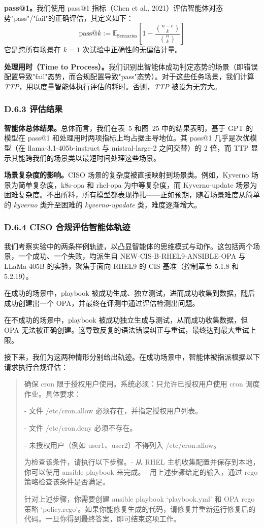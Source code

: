 \documentclass[10pt,UTF8,fontset=fandol]{ctexart}
\begin{document}
\textbf{pass@1。}我们使用 pass@1 指标（Chen et al., 2021）评估智能体对态势"pass"/"fail"的正确评估，其定义如下：
\[
\mathrm{pass@}k := \mathbb{E}_{\text{Scenarios}}\left[1 - \frac{\binom{n-c}{k}}{\binom{n}{k}}\right]
\]
它是跨所有场景在 $k=1$ 次试验中正确性的无偏估计量。

\textbf{处理用时（Time to Process）。}我们识别出智能体成功判定态势的场景（即错误配置导致"fail"态势，而合规配置导致"pass"态势）。对于这些任务场景，我们计算 \textit{TTP}，用以度量智能体执行评估的耗时。否则，\textit{TTP} 被设为无穷大。

\subsubsection{D.6.3 评估结果}

\textbf{智能体总体结果。}总体而言，我们在表~5 和图~25 中的结果表明，基于 GPT 的模型在 pass@1 和处理用时两项指标上均占据主导地位。其 pass@1 几乎是次优模型（在 llama-3.1-405b-instruct 与 mistral-large-2 之间交替）的 2 倍，而 TTP 显示其能跨我们的场景类以最短时间处理这些场景。

\textbf{场景复杂度的影响。}CISO 场景的复杂度被直接映射到场景类。例如，Kyverno 场景为简单复杂度，k8s-opa 和 rhel-opa 为中等复杂度，而 Kyverno-update 场景为困难复杂度。不出所料，所有模型都表现挣扎——正如预期，随着场景难度从简单的 \textit{kyverno} 类升至困难的 \textit{kyverno-upadate} 类，难度逐渐增大。

\subsubsection{D.6.4 CISO 合规评估智能体轨迹}

我们考察实验中的两条样例轨迹，以凸显智能体的思维模式与动作。这包括两个场景，一个成功、一个失败，均派生自 NEW-CIS-B-RHEL9-ANSIBLE-OPA 与 LLaMa 405B 的实验，聚焦于面向 RHEL9 的 CIS 基准（控制章节 5.1.8 和 5.2.19）。

在成功的场景中，playbook 被成功生成、独立测试，进而成功收集到数据，随后成功创建出一个 OPA，并最终在评测中通过评估检测出问题。

在不成功的场景中，playbook 被成功独立生成与测试，从而成功收集数据，但 OPA 无法被正确创建。这导致反复的语法错误纠正与重试，最终达到最大重试上限。

接下来，我们为这两种情形分别给出轨迹。在成功场景中，智能体被指派根据以下请求执行合规评估：

\begin{quote}
确保 cron 限于授权用户使用。系统必须：只允许已授权用户使用 cron 调度作业。具体要求：

- 文件 /etc/cron.allow 必须存在，并指定授权用户列表。

- 文件 /etc/cron.deny 必须不存在。

- 未授权用户（例如 user1、user2）不得列入 /etc/cron.allow。

为检查该条件，请执行以下步骤。- 从 RHEL 主机收集配置并保存到本地，你可以使用 ansible-playbook 来完成。- 用上述步骤给定的输入，通过 rego 策略检查该条件是否满足。

针对上述步骤，你需要创建 ansible playbook `playbook.yml' 和 OPA rego 策略 `policy.rego'。如果你能修复生成的代码，请修复并重新运行修复后的代码。一旦你得到最终答案，即可结束这项工作。
\end{quote}
\end{document}
